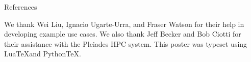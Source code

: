 \documentclass[final,12pt]{beamer}
\newlength{\sepwidth}
\newlength{\colwidth}
\newcommand{\separatorcolumn}{\begin{column}{\sepwidth}\end{column}}
\begin{document}
\begin{frame}[fragile,t]
\begin{columns}[T]
\begin{column}{\colwidth}
  \begin{block}{References}
    \scriptsize

    We thank Wei Liu, Ignacio Ugarte-Urra, and Fraser Watson for their help in developing example use cases. We also thank Jeff Becker and Bob Ciotti for their assistance with the Pleiades HPC system. This poster was typeset using Lua\TeX and Python\TeX \citep{poore_pythontex_2015}.

      \begin{multicols}{2}
        
        
      \end{multicols}

  \end{block}

\end{column}

\separatorcolumn
\end{columns}
\end{frame}
\end{document}
